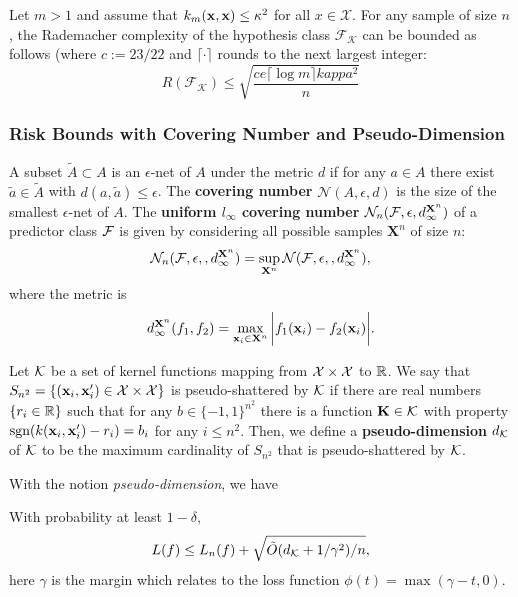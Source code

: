 \begin{theorem}\label{thm:new-rdm}
Let $m>1$ and assume that $k_m(\mathbf{x},\mathbf{x})\leq\kappa^2$ for all $x\in\mathcal X$. For any sample of size $n$, the Rademacher complexity of the hypothesis class $\mathcal F_{\mathcal K}$ can be bounded as follows (where $c:=23/22$ and $\lceil\cdot\rceil$ rounds to the next largest integer:
\[
R(\mathcal F_{\mathcal K}) \leq \sqrt{\frac{ce\lceil\log m\rceil
kappa^2}{n}}
\]
\end{theorem}

\subsubsection{Risk Bounds with Covering Number and Pseudo-Dimension}

\begin{definition} \label{def:cov-num}
A subset $\tilde{A} \subset A$ is an $\epsilon$-net of $A$ under the metric $d$ if for
any $a\in A$ there exist $\tilde{a} \in \tilde{A}$ with $d(a, \tilde{a}) \leq \epsilon$.
The {\bf covering number} $\mathcal N(A, \epsilon, d)$ is the size of the smallest
$\epsilon$-net of $A$. The {\bf uniform $l_\infty$ covering number} $\mathcal
N_n({\cal F}, \epsilon, d^{\mathbf X^n}_\infty)$ of a predictor class ${\cal F}$ is given by
considering all possible samples $\mathbf X^n$ of size $n$:
\[
\mathcal N_n({\cal F}, \epsilon, , d^{\mathbf X^n}_\infty) = \sup_{\mathbf X^n}\mathcal N({\cal F}, \epsilon, , d^{\mathbf X^n}_\infty),
\]
where the metric is
\[
d_{\infty}^{\mathbf X^n}(f_1, f_2) = \max_{\mathbf{x}_i \in \mathbf X^n}\bigg| f_1(\mathbf{x}_i) - f_2(\mathbf{x}_i) \bigg|.
\]
\end{definition}

\begin{definition} \label{def:pseudo-dim}
Let ${\cal K}$ be a set of kernel functions mapping from ${\cal X}\times{\cal X}$ to ${\mathbb R}$. We say that
$S_{n^2} = \{(\mathbf{x}_i, \mathbf{x}_i') \in {\cal X}\times{\cal X} \}$ is pseudo-shattered by ${\cal K}$ if there are
real numbers $\{r_i \in {\mathbb R} \}$ such that for any $b \in \{-1, 1\}^{n^2}$ there is a
function ${\mathbf K} \in {\cal K}$ with property $\mbox{sgn}(k(\mathbf{x}_i, \mathbf{x}_i') - r_i) = b_i$ for any $i\leq n^2$. Then, we define a {\bf pseudo-dimension} $d_{{\cal K}}$ of ${\cal K}$ to be the maximum cardinality of $S_{n^2}$ that is pseudo-shattered by ${\cal K}$.
\end{definition}

With the notion {\em pseudo-dimension}, we have
\begin{theorem} \label{thm:bnd-psdim-phi} \cite{colt/SrebroB06}
With probability at least $1 - \delta$,
\[
L(f) \leq L_n(f) + \sqrt{\tilde{O}(d_{{\cal K}} + 1 / \gamma^2) / n},
\]
here $\gamma$ is the margin which relates to the loss function $\phi(t) =
\max(\gamma - t, 0)$.
\end{theorem}

